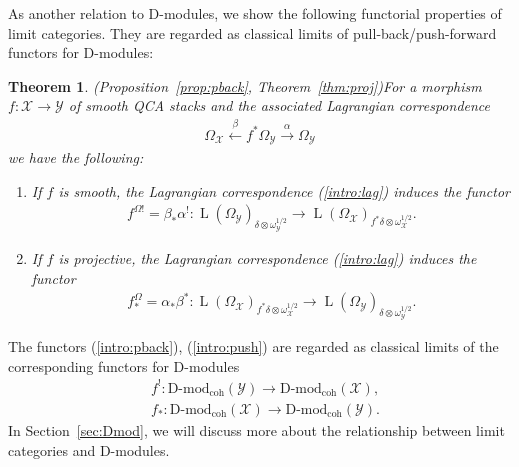 \documentclass [11pt,oneside,a4paper,mathscr]{amsart}
\newtheorem{thm}{Theorem}[section]
\theoremstyle{definition}
\newcommand{\Y}{\mathcal{Y}}
\newcommand{\LL}{\operatorname{L}}
\newcommand{\X}{\mathcal{X}}
\begin{document}
As another relation to D-modules, we show the following functorial properties of limit 
categories. They are regarded as classical limits of pull-back/push-forward 
functors for D-modules: 
\begin{thm}\emph{(Proposition~\ref{prop:pback}, Theorem~\ref{thm:proj})}\label{intro:thmfunct}
For a morphism $f\colon \X \to \Y$ of smooth QCA stacks
and the associated Lagrangian correspondence
\begin{align}\label{intro:lag}
\Omega_{\X} \stackrel{\beta}{\leftarrow} f^{*}\Omega_{\Y} \stackrel{\alpha}{\to} \Omega_{\Y}
\end{align}
we have the following: 
\begin{enumerate}
    \item If $f$ is smooth, the Lagrangian correspondence (\ref{intro:lag})
induces the functor 
\begin{align}\label{intro:pback}
    f^{\Omega!}=\beta_{*}\alpha^! \colon \LL(\Omega_{\Y})_{\delta \otimes \omega_{\Y}^{1/2}}
    \to \LL(\Omega_{\X})_{f^*\delta \otimes \omega_{\X}^{1/2}}.
\end{align}
\item If $f$ is projective, the Lagrangian 
correspondence (\ref{intro:lag}) induces the functor
\begin{align}\label{intro:push}
    f^{\Omega}_{*}=\alpha_{*}\beta^* \colon \LL(\Omega_{\X})_{f^*\delta \otimes \omega_{\X}^{1/2}}
    \to \LL(\Omega_{\Y})_{\delta \otimes \omega_{\Y}^{1/2}}.
\end{align}
\end{enumerate}
\end{thm}
The functors (\ref{intro:pback}), (\ref{intro:push}) are regarded 
as classical limits of the corresponding functors 
for D-modules 
\begin{align*}
  &f^! \colon \text{D-mod}_{\mathrm{coh}}(\Y) \to \text{D-mod}_{\mathrm{coh}}(\X), \\ 
   & f_{\ast} \colon \text{D-mod}_{\mathrm{coh}}(\X) \to \text{D-mod}_{\mathrm{coh}}(\Y).
\end{align*}
In Section~\ref{sec:Dmod}, we will discuss more about the relationship between limit categories 
and D-modules. 
\end{document}
